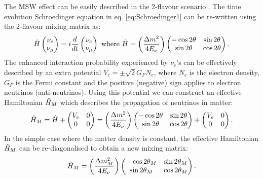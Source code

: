 The MSW effect can be easily described in the 2-flavour scenario \cite{Ricciardi2003}. The time evolution Schroedinger equation in eq. \ref{eq:Schroedinger1} can be re-written using the 2-flavour mixing matrix as:
\begin{equation}
    \Hat{H}
    \begin{pmatrix}
        \nu_e \\ \nu_\mu
    \end{pmatrix} = 
    i\frac{d}{dt}
    \begin{pmatrix}
    \nu_e \\ \nu_\mu
    \end{pmatrix}
    \text{  where  }
    \Hat{H}=
    \left(\frac{\Delta m^2}{4E_\nu}\right) 
    \begin{pmatrix}
        -\cos2\theta & \sin2\theta \\
        \sin{2\theta} & \cos{2\theta}
    \end{pmatrix} .
\end{equation}
The enhanced interaction probability experienced by $\nu_e$'s can be effectively described by an extra potential $V_e = \pm \sqrt{2} G_F N_e$, where $N_e$ is the electron density, $G_F$ is the Fermi constant and the positive (negative) sign applies to electron neutrinos (anti-neutrinos). Using this potential we can construct an effective Hamiltonian $\Hat{H}_M$ which describes the propagation of neutrinos in matter:
\begin{equation}
    \Hat{H}_M = \Hat{H}+
    \begin{pmatrix}
        V_e & 0\\
        0   & 0
    \end{pmatrix}
    =     \left(\frac{\Delta m^2}{4E_\nu}\right) 
    \begin{pmatrix}
        -\cos2\theta & \sin2\theta \\
        \sin{2\theta} & \cos{2\theta}
    \end{pmatrix} +
        \begin{pmatrix}
        V_e & 0\\
        0   & 0
    \end{pmatrix} .
\end{equation}
In the simple case where the matter density is constant, the effective Hamiltonian $\Hat{H}_M$ can be re-diagonalised to obtain a new mixing matrix:
\begin{equation}
    \Hat{H}_M=
    \left(\frac{\Delta m^2_M}{4E_\nu}\right) 
    \begin{pmatrix}
        -\cos2\theta_M & \sin2\theta_M \\
        \sin{2\theta}_M & \cos{2\theta_M}
    \end{pmatrix} . 
\end{equation}
